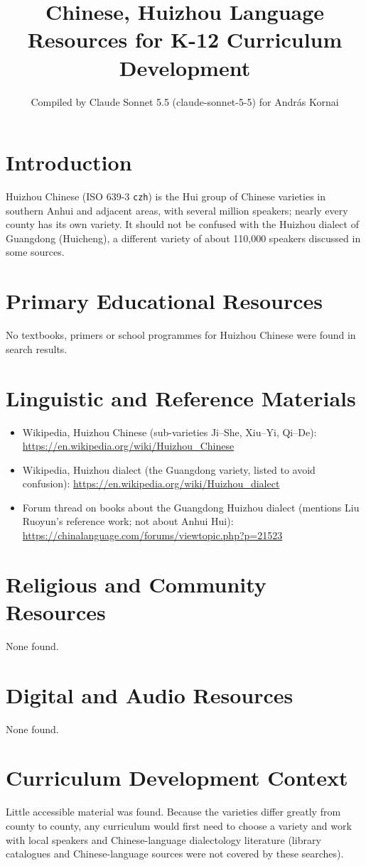 \documentclass[12pt]{article}
\title{Chinese, Huizhou Language Resources for K-12 Curriculum Development}
\author{Compiled by Claude Sonnet 5.5 (claude-sonnet-5-5) for Andr\'as Kornai}
\date{}
\begin{document}
\maketitle

\section{Introduction}
Huizhou Chinese (ISO 639-3 \texttt{czh}) is the Hui group of Chinese varieties in southern Anhui and adjacent areas, with several million speakers; nearly every county has its own variety. It should not be confused with the Huizhou dialect of Guangdong (Huicheng), a different variety of about 110,000 speakers discussed in some sources.

\section{Primary Educational Resources}
No textbooks, primers or school programmes for Huizhou Chinese were found in search results.

\section{Linguistic and Reference Materials}
\begin{itemize}
\item Wikipedia, Huizhou Chinese (sub-varieties Ji--She, Xiu--Yi, Qi--De): \url{https://en.wikipedia.org/wiki/Huizhou_Chinese}
\item Wikipedia, Huizhou dialect (the Guangdong variety, listed to avoid confusion): \url{https://en.wikipedia.org/wiki/Huizhou_dialect}
\item Forum thread on books about the Guangdong Huizhou dialect (mentions Liu Ruoyun's reference work; not about Anhui Hui): \url{https://chinalanguage.com/forums/viewtopic.php?p=21523}
\end{itemize}

\section{Religious and Community Resources}
None found.

\section{Digital and Audio Resources}
None found.

\section{Curriculum Development Context}
Little accessible material was found. Because the varieties differ greatly from county to county, any curriculum would first need to choose a variety and work with local speakers and Chinese-language dialectology literature (library catalogues and Chinese-language sources were not covered by these searches).
\end{document}
